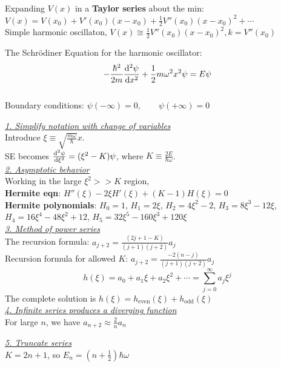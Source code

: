 Expanding $V(x)$ in a \textbf{Taylor series} about the min: $V(x) = V(x_0) + V'(x_0) (x - x_0) + \frac{1}{2} V''(x_0)(x- x_0)^2 + \cdots$ \\
Simple harmonic oscillaton, $V(x) \cong \frac{1}{2} V''(x_0) (x - x_0)^2, k = V''(x_0)$

The Schr\"{o}diner Equation for the harmonic oscillator: $$-\frac{\hbar^2}{2m} \dv[2]{\psi}{x} + \frac{1}{2} m \omega^2 x^2 \psi = E \psi$$ \\

Boundary conditions: $\psi(-\infty) = 0, \qquad \psi(+\infty) = 0$

\medskip

\textit{\underline{1. Simplify notation with change of variables}} \\
Introduce $\xi \equiv \sqrt{\frac{m \omega}{\hbar}} x$. \\
SE becomes $\dv[2]{\psi}{\xi} = (\xi^2 - K) \psi$, where $K \equiv \frac{2E}{\hbar \omega}$. \\

\textit{\underline{2. Asymptotic behavior}} \\

Working in the large $\xi^2 >> K$ region, \\
\textbf{Hermite eqn}: $H''(\xi) - 2 \xi H'(\xi) + (K - 1) H(\xi) = 0$ \\

\textbf{Hermite polynomials}: $H_0 = 1$, $H_1 = 2 \xi$, $H_2 = 4 \xi^2 - 2$, $H_3 = 8 \xi^3 - 12 \xi$, $H_4 = 16 \xi^4 - 48 \xi^2 + 12$, $H_5 = 32 \xi^5 - 160 \xi^3 + 120 \xi$ \\

\textit{\underline{3. Method of power series}} \\
The recursion formula: $a_{j+2} = \frac{(2j + 1 - K)}{(j + 1)(j + 2)} a_j$ \\
Recursion formula for allowed $K$: $a_{j+2} = \frac{-2(n - j)}{(j+1)(j+2)} a_j$ \\

$$h(\xi) = a_0 + a_1 \xi + a_2 \xi^2 + \cdots = \sum_{j=0}^{\infty} a_j \xi^j$$
The complete solution is $h(\xi) = h_{\text{even}}(\xi) + h_{\text{odd}}(\xi)$ \\

\textit{\underline{4. Infinite series produces a diverging function}} \\
For large $n$, we have $a_{n+2} \approx \frac{2}{n} a_n$ %

\textit{\underline{5. Truncate series}} \\
$K = 2n + 1$, so $E_n = (n + \frac{1}{2}) \hbar \omega$ \\

